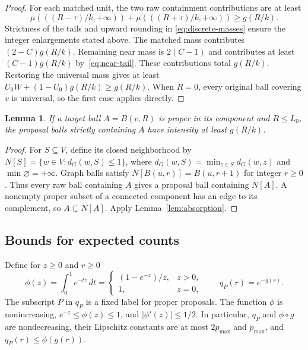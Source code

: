 \documentclass[11pt]{article}
\numberwithin{equation}{section}
\newtheorem{lemma}[theorem]{Lemma}
\theoremstyle{definition}
\begin{document}
\begin{proof}
For each matched unit, the two raw containment contributions are at least
\begin{equation}\label{eq:paired-tails}
 \mu(((R-\tau)/k,+\infty))+
 \mu(((R+\tau)/k,+\infty))\ge g(R/k).
\end{equation}
Strictness of the tails and upward rounding in
\eqref{eq:discrete-masses} ensure the integer enlargements stated above.
The matched mass contributes $(2-C)g(R/k)$.
Remaining near mass is $2(C-1)$ and contributes at least
$(C-1)g(R/k)$ by~\eqref{eq:near-tail}. These contributions total $g(R/k)$.
Restoring the universal mass gives at least
$U_0W+(1-U_0)g(R/k)\ge g(R/k)$.
When $R=0$, every original ball covering $v$ is universal, so the first
case applies directly.
\end{proof}

\begin{lemma}\label{lem:strict-growth}
If a target ball $A=B(v,R)$ is proper in its component and $R\le L_0$,
the proposal balls strictly containing $A$ have intensity at least
$g(R/k)$.
\end{lemma}
\begin{proof}
For $S\subseteq V$, define its closed neighborhood by
$N[S]=\{w\in V:d_G(w,S)\le1\}$, where
$d_G(w,S)=\min_{z\in S}d_G(w,z)$ and $\min\varnothing=+\infty$.
Graph balls satisfy $N[B(u,r)]=B(u,r+1)$ for integer $r\ge0$.
Thus every raw ball containing $A$ gives a proposal ball containing
$N[A]$. A nonempty proper subset of a connected component has an edge
to its complement, so $A\subsetneq N[A]$.
Apply Lemma~\ref{lem:absorption}.
\end{proof}

\subsection{Bounds for expected counts}

Define for $z\ge0$ and $r\ge0$
\begin{equation}\label{eq:phi-q}
 \phi(z)=\int_0^1e^{-tz}\,dt
 =\begin{cases}(1-e^{-z})/z,&z>0,\\1,&z=0,\end{cases}
 \qquad q_P(r)=e^{-g(r)}.
\end{equation}
The subscript $P$ in $q_P$ is a fixed label for proper proposals.
The function $\phi$ is nonincreasing, $e^{-z}\le\phi(z)\le1$, and
$|\phi'(z)|\le1/2$. In particular, $q_P$ and $\phi\circ g$ are
nondecreasing, their Lipschitz constants are at most $2p_{\max}$ and
$p_{\max}$, and $q_P(r)\le\phi(g(r))$.
\end{document}
